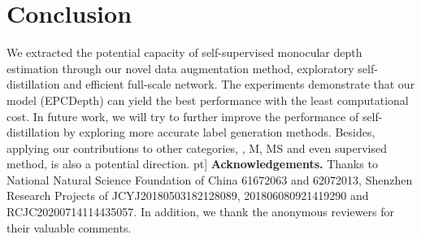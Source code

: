 \documentclass[10pt,twocolumn,letterpaper]{article}
\begin{document}
\section{Conclusion}

We extracted the potential capacity of self-supervised monocular depth estimation 
through our novel data augmentation method, 
exploratory self-distillation and efficient full-scale network. The experiments 
demonstrate that our model (EPCDepth) can yield the best performance with the least 
computational cost. In future work, we will try to further improve the performance of 
self-distillation by 
exploring more accurate label generation methods. Besides, applying our contributions 
to other categories, \eg, M, MS and even supervised method, is also a 
potential direction.
\5pt]
{\bf Acknowledgements.} Thanks to National Natural Science Foundation of China 
61672063 and 62072013, Shenzhen Research Projects of JCYJ20180503182128089, 
201806080921419290 and RCJC20200714114435057. In addition, we thank the
anonymous reviewers for their valuable comments.

{\small


}
\end{document}
